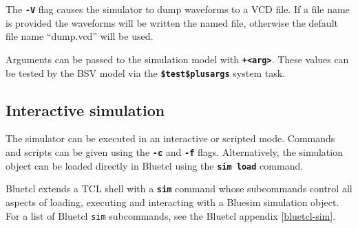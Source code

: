 \documentclass{article}
\newcommand{\te}[1]{\texttt{#1}}
\begin{document}
The {\bf\tt -V} flag causes the simulator to dump waveforms to a VCD
file.  If a file name is provided the waveforms will be written the
named file, otherwise the default file name ``dump.vcd'' will be used.

Arguments can be passed to the simulation model with {\bf\tt +<arg>}.
These values can be tested by the BSV model via the {\bf\tt \$test\$plusargs}
system task.


\subsection{Interactive simulation}
\label{bluesim-interactive}

The simulator can be executed in an interactive or scripted mode.
Commands and scripts can be given using the {\bf\tt -c} and
{\bf\tt -f} flags.  Alternatively, the simulation object can be loaded
directly in Bluetcl using the {\bf\tt sim load} command.


Bluetcl extends a TCL shell with a {\bf\tt sim} command whose
subcommands control all aspects of loading, executing and interacting
with a Bluesim simulation object.  For a list of Bluetcl \te{sim}
subcommands, see the Bluetcl appendix \ref{bluetcl-sim}.
\end{document}
